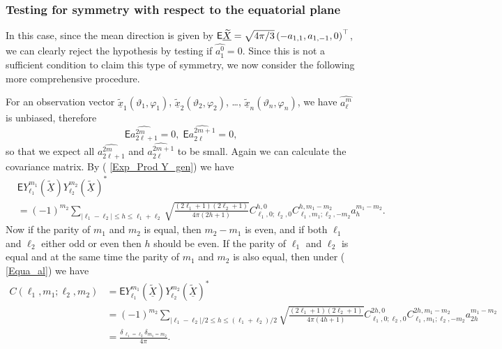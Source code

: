 \documentclass[preprint,11pt,a4paper]{elsarticle}
\begin{document}
\subsubsection{Testing for symmetry with respect to the equatorial plane}

In this case, since the mean direction is given by $\mathsf{E}\underline{%
\widetilde{X}}=\sqrt{4\pi/3}\left( -a_{1,1},a_{1,-1},0\right) ^{\top}$, we
can clearly reject the hypothesis by testing if $\widehat{a_{1}^{0}}=0$.
Since this is not a sufficient condition to claim this type of symmetry, we
now consider the following more comprehensive procedure.

For an observation vector $\underline{\widetilde{x}}_{1}\left( \vartheta
_{1},\varphi_{1}\right) $, $\underline{\widetilde{x}}_{2}\left(
\vartheta_{2},\varphi_{2}\right) $, \ldots, $\underline{\widetilde{x}}%
_{n}\left( \vartheta_{n},\varphi_{n}\right) $, we have $\widehat{a_{\ell
}^{m}}$ is unbiased, therefore 
\begin{equation}
\mathsf{E}\widehat{a_{2\ell+1}^{2m}}=0,\;\mathsf{E}\widehat{a_{2\ell}^{2m+1}}%
=0,  \label{Equa_al}
\end{equation}
so that we expect all $\widehat{a_{2\ell+1}^{2m}}$ and $\widehat{a_{2\ell
}^{2m+1}}$ to be small. Again we can calculate the covariance matrix. By (%
\ref{Exp_Prod Y_gen}) we have 
\begin{align*}
& \mathsf{E}Y_{\ell_{1}}^{m_{1}}\left( \underline{\widetilde{X}}\right)
Y_{\ell_{2}}^{m_{2}}\left( \underline{\widetilde{X}}\right) ^{\ast} \\
& =\left( -1\right) ^{m_{2}}\sum_{\left\vert \ell_{1}-\ell_{2}\right\vert
\leq h\leq\ell_{1}+\ell_{2}}\sqrt{\frac{\left( 2\ell_{1}+1\right) \left(
2\ell_{2}+1\right) }{4\pi\left( 2h+1\right) }}C_{\ell_{1},0;%
\ell_{2},0}^{h,0}C_{\ell_{1},m_{1};%
\ell_{2},-m_{2}}^{h,m_{1}-m_{2}}a_{h}^{m_{1}-m_{2}}.
\end{align*}
Now if the parity of $m_{1}$ and $m_{2}$ is equal, then $m_{2}-m_{1}$ is
even, and if both $\ell_{1}$ and $\ell_{2}$ either odd or even then $h$
should be even. If the parity of $\ell_{1}$ and $\ell_{2}$ is equal and at
the same time the parity of $m_{1}$ and $m_{2}$ is also equal, then under (%
\ref{Equa_al}) we have 
\begin{align*}
C\left( \ell_{1},m_{1};\ell_{2},m_{2}\right) & =\mathsf{E}%
Y_{\ell_{1}}^{m_{1}}\left( \underline{\widetilde{X}}\right)
Y_{\ell_{2}}^{m_{2}}\left( \underline{\widetilde{X}}\right) ^{\ast} \\
& =\left( -1\right) ^{m_{2}}\sum_{\left\vert \ell_{1}-\ell_{2}\right\vert
/2\leq h\leq\left( \ell_{1}+\ell_{2}\right) /2}\sqrt{\frac{\left( 2\ell
_{1}+1\right) \left( 2\ell_{2}+1\right) }{4\pi\left( 4h+1\right) }}%
C_{\ell_{1},0;\ell_{2},0}^{2h,0}C_{\ell_{1},m_{1};%
\ell_{2},-m_{2}}^{2h,m_{1}-m_{2}}a_{2h}^{m_{1}-m_{2}} \\
& =\frac{\delta_{\ \ell_{1}=\ell_{2}}\delta_{m_{1}=m_{2}}}{4\pi}.
\end{align*}
\end{document}
